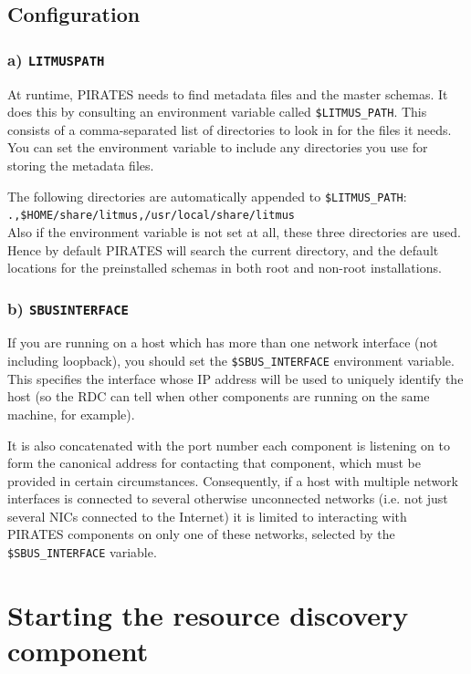 \documentclass[12pt,a4paper,twoside]{article}
\renewcommand{\_}{\texttt{\symbol{95}}}
\begin{document}
\subsection{Configuration}

\subsubsection*{a) \texttt{LITMUS\_PATH}}

At runtime, PIRATES needs to find metadata files and the master schemas.
It does this by consulting an environment variable called
\verb^$LITMUS_PATH^. This consists of a comma-separated list of
directories to look in for the files it needs. You can set the
environment variable to include any directories you use for
storing the metadata files.

The following directories are automatically appended to
\verb^$LITMUS_PATH^:\\
\verb^.,$HOME/share/litmus,/usr/local/share/litmus^\\
Also if the environment variable is not set at all, these
three directories are used.
Hence by default PIRATES will search the current directory, and the
default locations for the preinstalled schemas in both root
and non-root installations.

\subsubsection*{b) \texttt{SBUS\_INTERFACE}}

If you are running on a host which has more than one network interface
(not including loopback), you should set the \verb^$SBUS_INTERFACE^
environment variable. This specifies the interface whose IP address
will be used to uniquely identify the host (so the RDC can tell
when other components are running on the same machine, for example).

It is also concatenated with the port number each component is listening
on to form the canonical address for contacting that component, which
must be provided in certain circumstances. Consequently, if a host
with multiple network interfaces is connected to several otherwise
unconnected networks (i.e. not just several NICs connected to the
Internet) it is limited to interacting with PIRATES components on only one of
these networks, selected by the \verb^$SBUS_INTERFACE^ variable.

\section{Starting the resource discovery component}
\end{document}
